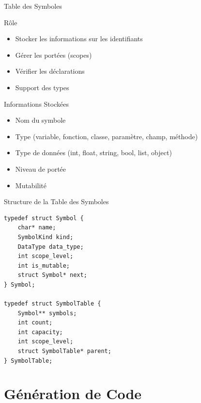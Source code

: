 \documentclass[10pt]{beamer}
\begin{document}
\begin{frame}{Table des Symboles}
    \begin{block}{Rôle}
        \begin{itemize}
            \item Stocker les informations sur les identifiants
            \item Gérer les portées (scopes)
            \item Vérifier les déclarations
            \item Support des types
        \end{itemize}
    \end{block}
    
    \begin{block}{Informations Stockées}
        \begin{itemize}
            \item Nom du symbole
            \item Type (variable, fonction, classe, paramètre, champ, méthode)
            \item Type de données (int, float, string, bool, list, object)
            \item Niveau de portée
            \item Mutabilité
        \end{itemize}
    \end{block}
\end{frame}

\begin{frame}[fragile]{Structure de la Table des Symboles}
    \begin{lstlisting}[style=algi-style, caption={symbol.h}]
typedef struct Symbol {
    char* name;
    SymbolKind kind;
    DataType data_type;
    int scope_level;
    int is_mutable;
    struct Symbol* next;
} Symbol;

typedef struct SymbolTable {
    Symbol** symbols;
    int count;
    int capacity;
    int scope_level;
    struct SymbolTable* parent;
} SymbolTable;
\end{lstlisting}
\end{frame}

\section{Génération de Code}
\end{document}
